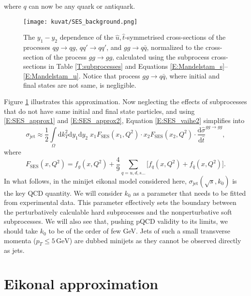 \documentclass[a4paper, twoside, english, 12pt]{report}
\begin{document}
where $q$ can now be any quark or antiquark.
\begin{figure}[b!]
	\centering
	\texttt{[image: kuvat/SES\_background.png]}	
	\caption{The $y_1-y_2$ dependence of the ${\hat{u},\hat{t}}$-symmetrised cross-sections of the processes $qg\rightarrow qg$, $qq'\rightarrow qq'$, and $gg\rightarrow q\bar{q}$, normalized to the cross-section of the process $gg\rightarrow gg$, calculated using the subprocess cross-sections in Table \ref{T:subprocesses} and Equations \eqref{E:Mandelstam_s}--\eqref{E:Mandelstam_u}. Notice that process $gg\rightarrow q\bar{q}$, where initial and final states are not same, is negligible.}
	\label{F:SES_back}
\end{figure} Figure \ref{F:SES_back} illustrates this approximation. Now neglecting the effects of subprocesses that do not have same initial and final state particles, and using \eqref{E:SES_approx1} and \eqref{E:SES_approx2}, Equation \eqref{E:SES_vaihe2} simplifies into
\begin{equation}\label{E:integrated_sigma_jet_SES}
\sigma_{\text{jet}} \approx \frac{1}{2}\int\limits_{\Omega}\text{d}k_T^2\text{d}y_1\text{d}y_2\; x_1F_{\text{SES}}(x_1,Q^2)\cdot x_2F_{\text{SES}}(x_2,Q^2) \cdot\frac{\text{d}\hat{\sigma}}{\text{d}\hat{t}}^{gg\rightarrow gg} ,
\end{equation}
where 
\begin{equation}\label{E:F_SES}
F_{\text{SES}}(x,Q^2) = f_g(x,Q^2) + \frac{4}{9} \sum\limits_{q=u,d,s\ldots }\bigg\lbrack f_q(x,Q^2)+f_{\bar{q}}(x,Q^2)\bigg\rbrack.
\end{equation}
In what follows, in the minijet eikonal model considered here, $\sigma_{\text{jet}}(\sqrt{s}, k_0)$ is the key QCD quantity. We will consider $k_0$ as a parameter that needs to be fitted from experimental data. This parameter effectively sets the boundary between the perturbatively calculable hard subprocesses and the nonperturbative soft subprocesses. We will also see that, pushing pQCD validity to its limits, we should take $k_0$ to be of the order of few GeV. Jets of such a small transverse momenta ($p_T \leq 5 \,\text{GeV}$) are dubbed minijets as they cannot be observed directly as jets.





\cleardoublepage
\chapter{Eikonal approximation}\label{S:Eikonal_approximation}
\end{document}
